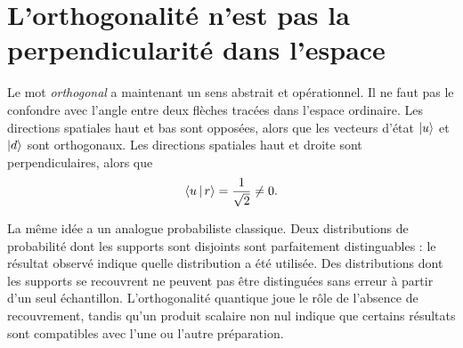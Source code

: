 \begin{classroomqa}
\end{classroomqa}

\section{L’orthogonalité n’est pas la perpendicularité dans l’espace}

Le mot \emph{orthogonal} a maintenant un sens abstrait et opérationnel. Il ne faut pas le confondre avec l’angle entre deux flèches tracées dans l’espace ordinaire. Les directions spatiales haut et bas sont opposées, alors que les vecteurs d’état \(\left\lvert u\right\rangle\) et \(\left\lvert d\right\rangle\) sont orthogonaux. Les directions spatiales haut et droite sont perpendiculaires, alors que
\begin{equation}
\left\langle u\,\middle|\,r\right\rangle=\frac1{\sqrt2}\ne0.
\end{equation}

\begin{classroomqa}
\end{classroomqa}

La même idée a un analogue probabiliste classique. Deux distributions de probabilité dont les supports sont disjoints sont parfaitement distinguables : le résultat observé indique quelle distribution a été utilisée. Des distributions dont les supports se recouvrent ne peuvent pas être distinguées sans erreur à partir d’un seul échantillon. L’orthogonalité quantique joue le rôle de l’absence de recouvrement, tandis qu’un produit scalaire non nul indique que certains résultats sont compatibles avec l’une ou l’autre préparation.


